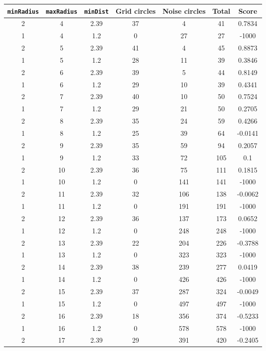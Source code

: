 \documentclass[letterpaper, 12pt]{article}
\begin{document}
\begin{longtable}{|c|c|c|c|c|c|c|}
\hline
\textbf{\texttt{minRadius}} & \textbf{\texttt{maxRadius}} & \textbf{\texttt{minDist}} & \textbf{Grid circles} & \textbf{Noise circles} & \textbf{Total} & \textbf{Score} \\
\hline
2 & 4 & 2.39 & 37 & 4 & 41 & 0.7834 \\
\hline
1 & 4 & 1.2 & 0 & 27 & 27 & -1000 \\
\hline
2 & 5 & 2.39 & 41 & 4 & 45 & 0.8873 \\
\hline
1 & 5 & 1.2 & 28 & 11 & 39 & 0.3846 \\
\hline
2 & 6 & 2.39 & 39 & 5 & 44 & 0.8149 \\
\hline
1 & 6 & 1.2 & 29 & 10 & 39 & 0.4341 \\
\hline
2 & 7 & 2.39 & 40 & 10 & 50 & 0.7524 \\
\hline
1 & 7 & 1.2 & 29 & 21 & 50 & 0.2705 \\
\hline
2 & 8 & 2.39 & 35 & 24 & 59 & 0.4266 \\
\hline
1 & 8 & 1.2 & 25 & 39 & 64 & -0.0141 \\
\hline
2 & 9 & 2.39 & 35 & 59 & 94 & 0.2057 \\
\hline
1 & 9 & 1.2 & 33 & 72 & 105 & 0.1 \\
\hline
2 & 10 & 2.39 & 36 & 75 & 111 & 0.1815 \\
\hline
1 & 10 & 1.2 & 0 & 141 & 141 & -1000 \\
\hline
2 & 11 & 2.39 & 32 & 106 & 138 & -0.0062 \\
\hline
1 & 11 & 1.2 & 0 & 191 & 191 & -1000 \\
\hline
2 & 12 & 2.39 & 36 & 137 & 173 & 0.0652 \\
\hline
1 & 12 & 1.2 & 0 & 248 & 248 & -1000 \\
\hline
2 & 13 & 2.39 & 22 & 204 & 226 & -0.3788 \\
\hline
1 & 13 & 1.2 & 0 & 323 & 323 & -1000 \\
\hline
2 & 14 & 2.39 & 38 & 239 & 277 & 0.0419 \\
\hline
1 & 14 & 1.2 & 0 & 426 & 426 & -1000 \\
\hline
2 & 15 & 2.39 & 37 & 287 & 324 & -0.0049 \\
\hline
1 & 15 & 1.2 & 0 & 497 & 497 & -1000 \\
\hline
2 & 16 & 2.39 & 18 & 356 & 374 & -0.5233 \\
\hline
1 & 16 & 1.2 & 0 & 578 & 578 & -1000 \\
\hline
2 & 17 & 2.39 & 29 & 391 & 420 & -0.2405 \\

\end{longtable}
\end{document}
